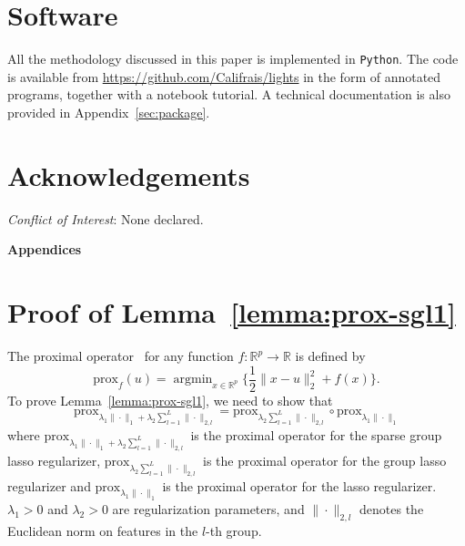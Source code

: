 \documentclass[11pt]{article}
\DeclareMathOperator{\argmin}{argmin}
\newcommand{\norm}[1]{\|#1\|}
\newcommand{\R}{\mathds R}
\begin{document}
\section*{Software}
All the methodology discussed in this paper is implemented in \texttt{Python}. The code is available from \url{https://github.com/Califrais/lights} in the form of annotated programs, together with a notebook tutorial. A technical documentation is also provided in Appendix~\ref{sec:package}.

\section*{Acknowledgements}
\textit{Conflict of Interest}: None declared.

\appendix

\begin{center}
\LARGE \textbf{Appendices}
\end{center}

\section{Proof of Lemma~\ref{lemma:prox-sgl1}}
\label{sec:proof-lemma-prox-sgl1}

The proximal operator~\citep{moreau1962fonctions} for any function $f : \R^p \to \R$ is defined by
\begin{equation}
    \label{eq:prox-def}
    \text{prox}_{f}(u) = \argmin_{x \in \R^p} \big\{\frac{1}{2}\norm{x - u}_2^2 + f(x)\big\}.
\end{equation}
To prove Lemma~\ref{lemma:prox-sgl1}, we need to show that
\[\text{prox}_{\lambda_1 \norm{\cdot}_1 + \lambda_2 \sum_{l=1}^L  \norm{\cdot}_{2,l}} = \text{prox}_{\lambda_2 \sum_{l=1}^L \norm{\cdot}_{2,l}} \circ \text{prox}_{\lambda_1 \norm{\cdot}_1}\]
where $\text{prox}_{\lambda_1 \norm{\cdot}_1 + \lambda_2 \sum_{l=1}^L \norm{\cdot}_{2,l}}$ is the proximal operator for the sparse group lasso regularizer, $\text{prox}_{\lambda_2 \sum_{l=1}^L \norm{\cdot}_{2,l}}$ is the proximal operator for the group lasso regularizer and $\text{prox}_{\lambda_1 \norm{\cdot}_1}$ is the proximal operator for the lasso regularizer. $\lambda_1 > 0$ and $\lambda_2 > 0$ are regularization parameters, and $\norm{\cdot}_{2,l}$ denotes the Euclidean norm on features in the $l$-th group.
\end{document}
